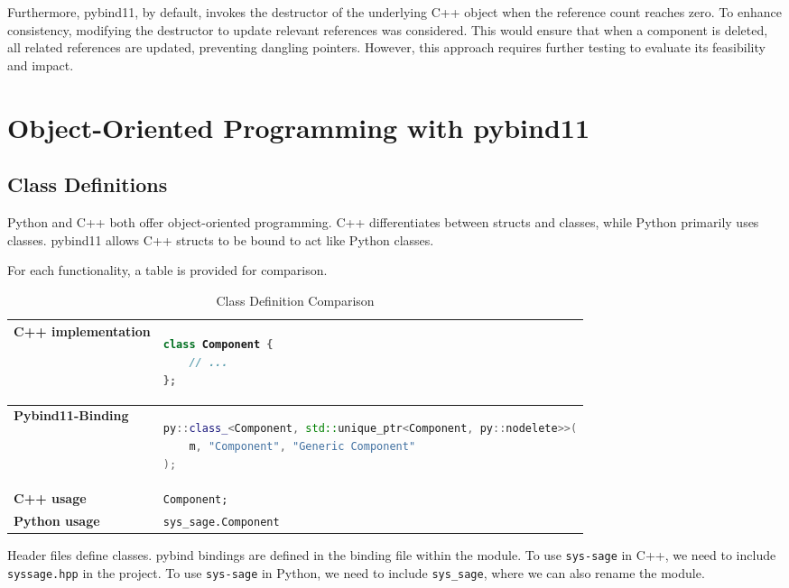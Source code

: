 Furthermore, pybind11, by default, invokes the destructor of the underlying C++ object when the reference count reaches zero. To enhance consistency, modifying the destructor to update relevant references was considered. This would ensure that when a component is deleted, all related references are updated, preventing dangling pointers. However, this approach requires further testing to evaluate its feasibility and impact.
\section{Object-Oriented Programming with pybind11}

\subsection{Class Definitions}

Python and C++ both offer object-oriented programming. C++ differentiates between structs and classes, while Python primarily uses classes. pybind11 allows C++ structs to be bound to act like Python classes.

For each functionality, a table is provided for comparison.

\begin{table}[htbp]
\centering
\begin{tabular}{|l|l|}
\hline
\textbf{C++ implementation} &
\begin{lstlisting}[language=C++]
class Component {
    // ...
};
\end{lstlisting}
\\ \hline
\textbf{Pybind11-Binding} &
\begin{lstlisting}[language=C++]
py::class_<Component, std::unique_ptr<Component, py::nodelete>>(
    m, "Component", "Generic Component"
);
\end{lstlisting}
\\ \hline
\textbf{C++ usage} &
\verb|Component;| \\ \hline
\textbf{Python usage} &
\verb|sys_sage.Component| \\ \hline
\end{tabular}
\caption{Class Definition Comparison}
\label{tab:class_definition}
\end{table}

Header files define classes. pybind bindings are defined in the binding file within the module. To use \verb|sys-sage| in C++, we need to include \verb|syssage.hpp| in the project. To use \verb|sys-sage| in Python, we need to include \verb|sys_sage|, where we can also rename the module.

